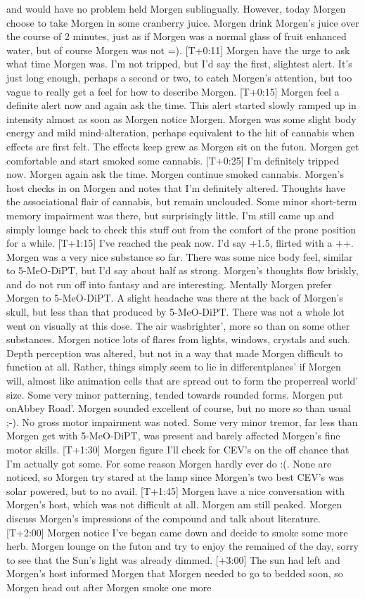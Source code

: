 \documentclass[12pt]{book}
\begin{document}
and would have no problem held Morgen sublingually. However, today Morgen choose to take Morgen in some cranberry juice. Morgen drink Morgen's juice over the course of 2 minutes, just as if Morgen was a normal glass of fruit enhanced water, but of course Morgen was not =). [T+0:11] Morgen have the urge to ask what time Morgen was. I'm not tripped, but I'd say the first, slightest alert. It's just long enough, perhaps a second or two, to catch Morgen's attention, but too vague to really get a feel for how to describe Morgen. [T+0:15] Morgen feel a definite alert now and again ask the time. This alert started slowly ramped up in intensity almost as soon as Morgen notice Morgen. Morgen was some slight body energy and mild mind-alteration, perhaps equivalent to the hit of cannabis when effects are first felt. The effects keep grew as Morgen sit on the futon. Morgen get comfortable and start smoked some cannabis. [T+0:25] I'm definitely tripped now. Morgen again ask the time. Morgen continue smoked cannabis. Morgen's host checks in on Morgen and notes that I'm definitely altered. Thoughts have the associational flair of cannabis, but remain unclouded. Some minor short-term memory impairment was there, but surprisingly little. I'm still came up and simply lounge back to check this stuff out from the comfort of the prone position for a while. [T+1:15] I've reached the peak now. I'd say +1.5, flirted with a ++. Morgen was a very nice substance so far. There was some nice body feel, similar to 5-MeO-DiPT, but I'd say about half as strong. Morgen's thoughts flow briskly, and do not run off into fantasy and are interesting. Mentally Morgen prefer Morgen to 5-MeO-DiPT. A slight headache was there at the back of Morgen's skull, but less than that produced by 5-MeO-DiPT. There was not a whole lot went on visually at this dose. The air wasbrighter', more so than on some other substances. Morgen notice lots of flares from lights, windows, crystals and such. Depth perception was altered, but not in a way that made Morgen difficult to function at all. Rather, things simply seem to lie in differentplanes' if Morgen will, almost like animation cells that are spread out to form the properreal world' size. Some very minor patterning, tended towards rounded forms. Morgen put onAbbey Road'. Morgen sounded excellent of course, but no more so than usual ;-). No gross motor impairment was noted. Some very minor tremor, far less than Morgen get with 5-MeO-DiPT, was present and barely affected Morgen's fine motor skills. [T+1:30] Morgen figure I'll check for CEV's on the off chance that I'm actually got some. For some reason Morgen hardly ever do :(. None are noticed, so Morgen try stared at the lamp since Morgen's two best CEV's was solar powered, but to no avail. [T+1:45] Morgen have a nice conversation with Morgen's host, which was not difficult at all. Morgen am still peaked. Morgen discuss Morgen's impressions of the compound and talk about literature. [T+2:00] Morgen notice I've began came down and decide to smoke some more herb. Morgen lounge on the futon and try to enjoy the remained of the day, sorry to see that the Sun's light was already dimmed. [+3:00] The sun had left and Morgen's host informed Morgen that Morgen needed to go to bedded soon, so Morgen head out after Morgen smoke one more 
\end{document}
